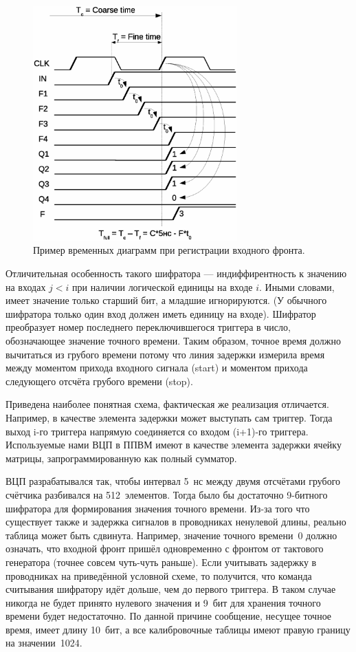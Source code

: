 \begin{figure}[H]
\centering
\includegraphics[width=0.7\textwidth]{pictures/TDC_diag.eps}
\caption{Пример временных диаграмм при регистрации входного фронта.}
\label{fig:TDCtimeDiag}
\end{figure}

Отличительная особенность такого шифратора --- индиффирентность к значению на входах $j<i$ при наличии логической единицы на входе $i$. Иными словами, имеет значение только старший бит, а младшие игнорируются. (У обычного шифратора только один вход должен иметь единицу на входе). Шифратор преобразует номер последнего переключившегося триггера в число, обозначающее значение точного времени. Таким образом, точное время должно вычитаться из грубого времени потому что линия задержки измерила время между моментом прихода входного сигнала (start) и моментом прихода следующего отсчёта грубого времени (stop).

Приведена наиболее понятная схема, фактическая же реализация отличается. Например, в качестве элемента задержки может выступать сам триггер. Тогда выход i-го триггера напрямую соединяется со входом (i+1)-го триггера. Используемые нами ВЦП в ППВМ имеют в качестве элемента задержки ячейку матрицы, запрограммированную как полный сумматор.


ВЦП разрабатывался так, чтобы интервал 5~нс между двумя отсчётами грубого счётчика разбивался на 512~элементов. Тогда было бы достаточно 9-битного шифратора для формирования значения точного времени. Из-за того что существует также и задержка сигналов в проводниках ненулевой длины, реально таблица может быть сдвинута. Например, значение точного времени~0 должно означать, что входной фронт пришёл одновременно с фронтом от тактового генератора (точнее совсем чуть-чуть раньше). Если учитывать задержку в проводниках на приведённой условной схеме, то получится, что команда считывания шифратору идёт дольше, чем до первого триггера. В таком случае никогда не будет принято нулевого значения и 9~бит для хранения точного времени будет недостаточно. По данной причине сообщение, несущее точное время, имеет длину 10~бит, а все калибровочные таблицы имеют правую границу на значении~1024.

